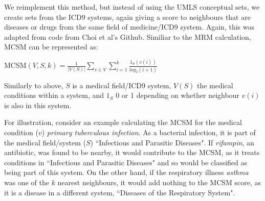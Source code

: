 \documentclass[11pt,a4paper]{article}
\begin{document}
We reimplement this method, but instead of using the UMLS conceptual sets, we create sets from the ICD9 systems, again giving a score to neighbours that are diseases or drugs from the same field of medicine/ICD9 system. Again, this was adapted from code from Choi et al's Github. Similiar to the MRM calculation,  MCSM can be represented as:

MCSM$(V,S,k) = \frac{1}{|V(S)|}\sum\limits_{v\in V}\sum\limits_{i=1}^k \frac{1_S(v(i))}{log_2(i+1)}$

Similarly to above, $S$ is a medical field/ICD9 system, $V(S)$ the medical conditions within a system, and $1_S$ 0 or 1 depending on whether neighbour $v(i)$ is also in this system. 

For illustration, consider an example calculating the MCSM for the medical condition ($v$) \emph{primary tuberculous infection}. As a bacterial infection, it is part of the medical field/system ($S$) ``Infectious and Parasitic Diseases". If \emph{rifampin}, an antibiotic, was found to be nearby, it would contribute to the MCSM, as it treats conditions in ``Infectious and Parasitic Diseases" and so would be classified as being part of this system. On the other hand, if the respiratory illness \emph{asthma} was one of the $k$ nearest neighbours, it would add nothing to the MCSM score, as it is a disease in a different system, ``Diseases of the Respiratory System". 





%
\end{document}

